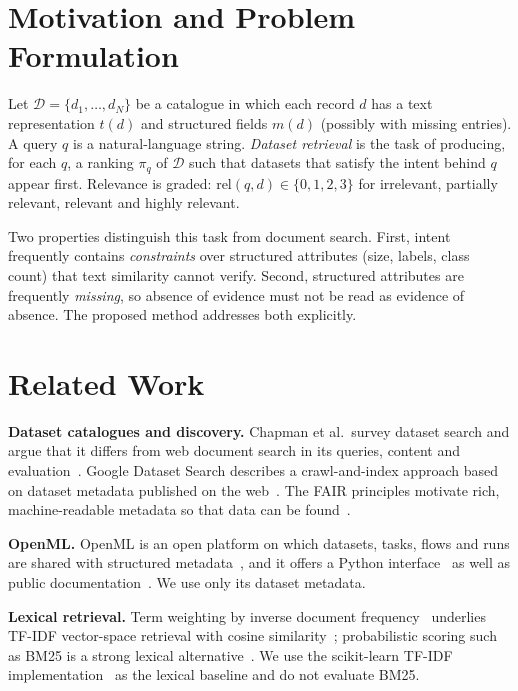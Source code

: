 \documentclass[conference]{IEEEtran}
\begin{document}
\section{Motivation and Problem Formulation}
Let $\mathcal{D}=\{d_1,\dots,d_N\}$ be a catalogue in which each record $d$ has a text representation $t(d)$ and structured fields $m(d)$ (possibly with missing entries). A query $q$ is a natural-language string. \emph{Dataset retrieval} is the task of producing, for each $q$, a ranking $\pi_q$ of $\mathcal{D}$ such that datasets that satisfy the intent behind $q$ appear first. Relevance is graded: $\mathrm{rel}(q,d)\in\{0,1,2,3\}$ for irrelevant, partially relevant, relevant and highly relevant.

Two properties distinguish this task from document search. First, intent frequently contains \emph{constraints} over structured attributes (size, labels, class count) that text similarity cannot verify. Second, structured attributes are frequently \emph{missing}, so absence of evidence must not be read as evidence of absence. The proposed method addresses both explicitly.

\section{Related Work}
\textbf{Dataset catalogues and discovery.} Chapman et al.\ survey dataset search and argue that it differs from web document search in its queries, content and evaluation~\cite{chapman2020dataset}. Google Dataset Search describes a crawl-and-index approach based on dataset metadata published on the web~\cite{brickley2019google}. The FAIR principles motivate rich, machine-readable metadata so that data can be found~\cite{wilkinson2016fair}.

\textbf{OpenML.} OpenML is an open platform on which datasets, tasks, flows and runs are shared with structured metadata~\cite{vanschoren2013openml}, and it offers a Python interface~\cite{feurer2021openmlpython} as well as public documentation~\cite{openmldocs}. We use only its dataset metadata.

\textbf{Lexical retrieval.} Term weighting by inverse document frequency~\cite{sparckjones1972idf} underlies TF-IDF vector-space retrieval with cosine similarity~\cite{manning2008irbook}; probabilistic scoring such as BM25 is a strong lexical alternative~\cite{robertson2009bm25}. We use the scikit-learn TF-IDF implementation~\cite{pedregosa2011sklearn,sklearntfidf} as the lexical baseline and do not evaluate BM25.
\end{document}
